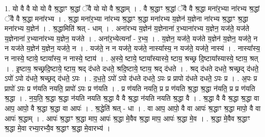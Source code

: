 \documentclass[17pt]{extarticle}
\begin{document}
1. यो वै वै यो यो वै श्र॒द्धाꣳ श्र॒द्धां ॅवै यो यो वै श्र॒द्धाम् । . वै श्र॒द्धाꣳ श्र॒द्धां ॅवै वै श्र॒द्धा मना॑र॒भ्या ना॑रभ्य श्र॒द्धां ॅवै वै श्र॒द्धा मना॑रभ्य । . श्र॒द्धा मना॑र॒भ्या ना॑रभ्य श्र॒द्धाꣳ श्र॒द्धा मना॑रभ्य य॒ज्ञेन॑ य॒ज्ञेना ना॑रभ्य श्र॒द्धाꣳ श्र॒द्धा मना॑रभ्य य॒ज्ञेन॑ । . श्र॒द्धामिति॑ श्रत् - धाम् । . अना॑रभ्य य॒ज्ञेन॑ य॒ज्ञेनाना॑ र॒भ्याना॑रभ्य य॒ज्ञेन॒ यज॑ते॒ यज॑ते य॒ज्ञेनाना॑ र॒भ्याना॑रभ्य य॒ज्ञेन॒ यज॑ते । . अना॑र॒भ्येत्यना᳚ - र॒भ्य॒ । . य॒ज्ञेन॒ यज॑ते॒ यज॑ते य॒ज्ञेन॑ य॒ज्ञेन॒ यज॑ते॒ न न यज॑ते य॒ज्ञेन॑ य॒ज्ञेन॒ यज॑ते॒ न । . यज॑ते॒ न न यज॑ते॒ यज॑ते॒ नास्या᳚स्य॒ न यज॑ते॒ यज॑ते॒ नास्य॑ । . नास्या᳚स्य॒ न नास्ये॒ ष्टाये॒ ष्टाया᳚स्य॒ न नास्ये॒ ष्टाय॑ । . अ॒स्ये॒ ष्टाये॒ ष्टाया᳚स्यास्ये॒ ष्टाय॒ श्रच्छ्र दि॒ष्टाया᳚स्यास्ये॒ ष्टाय॒ श्रत् । . इ॒ष्टाय॒ श्रच्छ्रदि॒ष्टाये॒ ष्टाय॒ श्रद् द॑धते दधते॒ श्रदि॒ष्टाये॒ ष्टाय॒ श्रद् द॑धते । . श्रद् द॑धते दधते॒ श्रच्छ्रद् द॑धते॒ ऽपो॑ ऽपो द॑धते॒ श्रच्छ्रद् द॑धते॒ ऽपः । . द॒ध॒ते॒ ऽपो॑ ऽपो द॑धते दधते॒ ऽपः प्र प्रापो द॑धते दधते॒ ऽपः प्र । . अ॒पः प्र प्रापो॑ ऽपः प्र ण॑यति नयति॒ प्रापो॑ ऽपः प्र ण॑यति । . प्र ण॑यति नयति॒ प्र प्र ण॑यति श्र॒द्धा श्र॒द्धा न॑यति॒ प्र प्र ण॑यति श्र॒द्धा । . न॒य॒ति॒ श्र॒द्धा श्र॒द्धा न॑यति नयति श्र॒द्धा वै वै श्र॒द्धा न॑यति नयति श्र॒द्धा वै । . श्र॒द्धा वै वै श्र॒द्धा श्र॒द्धा वा आप॒ आपो॒ वै श्र॒द्धा श्र॒द्धा वा आपः॑ । . श्र॒द्धेति॑ श्रत् - धा । . वा आप॒ आपो॒ वै वा आपः॑ श्र॒द्धाꣳ श्र॒द्धा मापो॒ वै वा आपः॑ श्र॒द्धाम् । . आपः॑ श्र॒द्धाꣳ श्र॒द्धा माप॒ आपः॑ श्र॒द्धा मे॒वैव श्र॒द्धा माप॒ आपः॑ श्र॒द्धा मे॒व । . श्र॒द्धा मे॒वैव श्र॒द्धाꣳ श्र॒द्धा मे॒वा रभ्या॒रभ्यै॒व श्र॒द्धाꣳ श्र॒द्धा मे॒वारभ्य॑ । \newline
\end{document}
